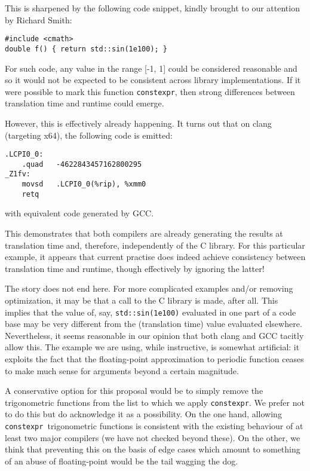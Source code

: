 \documentclass[prd,twocolumn,amsmath,amssymb,nofootinbib,eqsecnum]{revtex4-1}
\newcommand{\constexpr}{\code{constexpr}\xspace}
\newcommand{\code}[1]{{\tt #1}}
\begin{document}
This is sharpened by the following code snippet, kindly brought to our attention by Richard Smith:

\begin{Verbatim}
#include <cmath>
double f() { return std::sin(1e100); }
\end{Verbatim}
For such code, any value in the range [-1, 1] could be considered reasonable and so it would not be expected to be consistent across library implementations. If it were possible to mark this function \constexpr, then strong differences between translation time and runtime could emerge. 

However, this is effectively already happening. It turns out that on clang (targeting x64), the following code is emitted:
\begin{Verbatim}
.LCPI0_0:
	.quad	-4622843457162800295 
_Z1fv:
	movsd	.LCPI0_0(%rip), %xmm0
	retq
\end{Verbatim}
with equivalent code generated by GCC.

This demonstrates that both compilers are already generating the results at translation time and, therefore, independently of the C library. For this particular example, it appears that current practise does indeed achieve consistency between translation time and runtime, though effectively by ignoring the latter!

The story does not end here. For more complicated examples and/or removing optimization, it may be that a call to the C library is made, after all. This implies that the value of, say, \code{std::sin(1e100)} evaluated in one part of a code base may be very different from the (translation time) value evaluated elsewhere. Nevertheless, it seems reasonable in our opinion that both clang and GCC tacitly allow this. The example we are using, while instructive, is somewhat artificial: it exploits the fact that the floating-point approximation to periodic function ceases to make much sense for arguments beyond a certain magnitude.


A conservative option for this proposal would be to simply remove the trigonometric functions from the list to which we apply \constexpr. We prefer not to do this but do acknowledge it as a possibility. On the one hand, allowing \constexpr\ trigonometric functions is consistent with the existing behaviour of at least two major compilers (we have not checked beyond these). On the other, we think that preventing this on the basis of edge cases which amount to something of an abuse of floating-point would be the tail wagging the dog.
\end{document}
